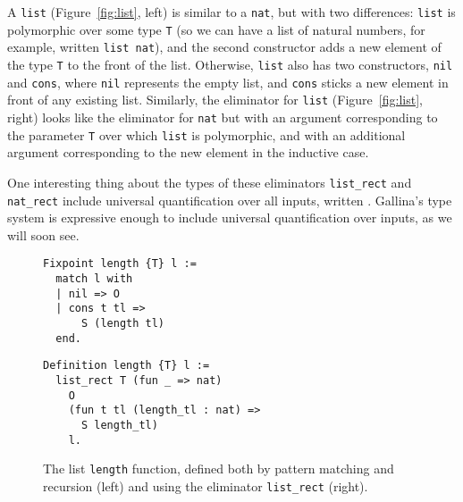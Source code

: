 
A \lstinline{list} (Figure~\ref{fig:list}, left) is similar to a \lstinline{nat}, 
but with two differences: \lstinline{list} is polymorphic over some type \lstinline{T} (so we can have a list of natural numbers,
for example, written \lstinline{list nat}), and the second constructor adds a new element of the type \lstinline{T} to the front of the list.
Otherwise, \lstinline{list} also has two constructors, \lstinline{nil} and \lstinline{cons}, where \lstinline{nil} represents the empty list,
and \lstinline{cons} sticks a new element in front of any existing list.
Similarly, the eliminator for \lstinline{list} (Figure~\ref{fig:list}, right) looks like the eliminator for \lstinline{nat} 
but with an argument corresponding to the parameter \lstinline{T} over which \lstinline{list} is polymorphic,
and with an additional argument corresponding to the new element in the inductive case.

One interesting thing about the types of these eliminators \lstinline{list_rect} and \lstinline{nat_rect}
include universal quantification over all inputs, written \ltacforall.
Gallina's type system is expressive enough to include universal quantification over inputs, as we will soon see.

\begin{figure}
\begin{minipage}{0.42\textwidth}
\begin{lstlisting}
Fixpoint length {T} l :=
  match l with
  | nil => O
  | cons t tl =>
      S (length tl)
  end.
\end{lstlisting}
\end{minipage}
\hfill
\begin{minipage}{0.54\textwidth}
\begin{lstlisting}
Definition length {T} l :=
  list_rect T (fun _ => nat)
    O
    (fun t tl (length_tl : nat) =>
      S length_tl)
    l.
\end{lstlisting}
\end{minipage}
\caption{The list \lstinline{length} function, defined both by pattern matching and recursion (left) and using the eliminator \lstinline{list_rect} (right).}
\label{fig:length}
\end{figure}

